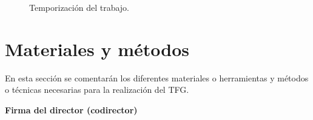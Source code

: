 \documentclass[titlepage, 12pt, a4paper, oneside]{article}
\begin{document}
\begin{figure}
  \begin{center}
  \end{center}
  \caption{Temporización del trabajo.\label{fig:temporizacion}}
\end{figure}

\section{Materiales y métodos}
En esta sección se comentarán los diferentes materiales o herramientas y métodos o técnicas necesarias para la realización del TFG.




\begin{center}
  \textbf{Firma del director (codirector)}
\end{center}
\end{document}
